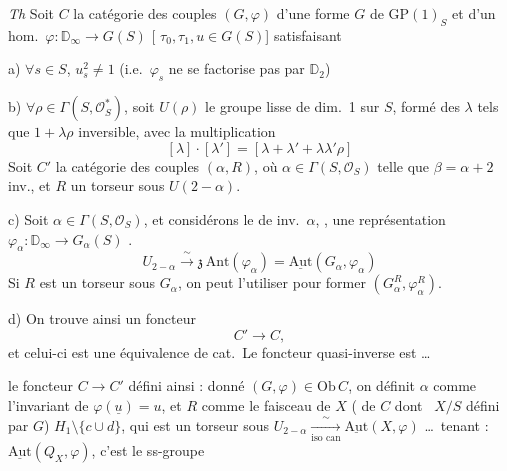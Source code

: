 \documentclass[11pt,a4paper]{article}
\begin{document}
\emph{Th} Soit \struck{\ill{}} $C$ la catégorie des couples $(G, \varphi)$
d'une forme $G$ de $\mathrm{GP}(1)_S$ et d'un hom.\ $\varphi : \mathbb{D}_\infty
\to G(S)$ [ $\tau_0, \tau_1, u \in G(S)$] satisfaisant

a) $\forall s \in S$, $u_s^2 \neq 1$ (i.e.\ $\varphi_s$ ne se factorise pas par
$\mathbb{D}_2$)

b)  $\forall \rho
\in \Gamma(S, \mathcal{O}_S^*)$, soit $U(\rho)$ le groupe \struck{\ill{}}
lisse de dim.\ 1 sur $S$,  formé des $\lambda$ tels que $1 +
\lambda\rho$ inversible, avec la multiplication
\[
[\lambda] \cdot [\lambda'] = [\lambda + \lambda' + \lambda\lambda'\rho]
\]
Soit $C'$ la catégorie des couples $(\alpha, R)$, où $\alpha \in \Gamma(S,
\mathcal{O}_S)$ telle que $\beta = \alpha + 2$ inv., et $R$ un torseur sous
\struck{\ill{}} $U(2 - \alpha)$.

c) Soit $\alpha \in \Gamma(S, \mathcal{O}_S)$, 
et considérons le  de inv.\ $\alpha$, ,
 une représentation
$\varphi_\alpha : \mathbb{D}_\infty \to G_\alpha(S)$ .
\[
U_{2-\alpha} \xrightarrow{\ \sim\ } \mathfrak{z}\,\mathrm{Ant}(\varphi_\alpha) =
\underline{\mathrm{Aut}}(G_\alpha, \varphi_\alpha)
\]
Si $R$ est un torseur sous $G_\alpha$, on peut l'utiliser pour former
$(G_\alpha^R, \varphi_\alpha^R)$.

d) On trouve ainsi un foncteur
\[
C' \longrightarrow C,
\]
et celui-ci est une équivalence de cat.\ Le foncteur quasi-inverse est
\ldots


le foncteur $C \to C'$ défini ainsi : donné $(G, \varphi) \in \mathrm{Ob}\,C$,
on définit $\alpha$ comme l'invariant de $\varphi(\underline{u}) = u$, et $R$
comme le  faisceau de $X$ ( \ill{} de $C$ dont \ $X/S$ défini par $G$)
 $H_1 \setminus \lbrace c \cup d \rbrace$, qui est un torseur
sous $U_{2-\alpha} \xrightarrow[\text{iso can}]{\ \sim\ }
\underline{\mathrm{Aut}}(X, \varphi)$ \ldots\ tenant :
$\underline{\mathrm{Aut}}(Q_X, \varphi)$, c'est le ss-groupe
\end{document}
